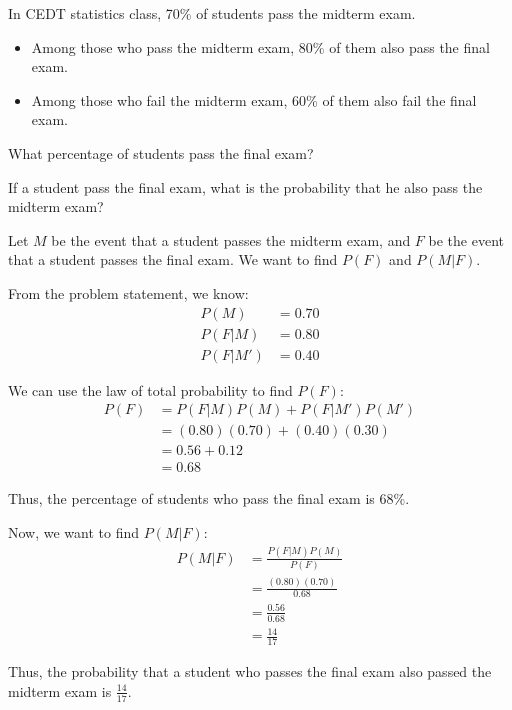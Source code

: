\documentclass[a4paper, 10pt]{article}
\begin{document}
\begin{problem}
In CEDT statistics class, 70\% of students pass the midterm exam.
\begin{itemize}[wide=0pt, itemsep=2pt, parsep=0pt, leftmargin=*]
	\item Among those who pass the midterm exam, 80\% of them also pass the final exam.
	\item Among those who fail the midterm exam, 60\% of them also fail the final exam.
\end{itemize}
\begin{subproblems_alpha}
	\item What percentage of students pass the final exam?
	\item If a student pass the final exam, what is the probability that he also pass the midterm exam?
\end{subproblems_alpha}
\end{problem}

\begin{solution}
	Let \( M \) be the event that a student passes the midterm exam, and \( F \) be the event that a student passes the final exam.
	We want to find \( P(F) \) and \( P(M | F) \).

	\par From the problem statement, we know:
	\begin{align*}
		P(M)      & = 0.70 \\
		P(F | M)  & = 0.80 \\
		P(F | M') & = 0.40
	\end{align*}

	\par We can use the law of total probability to find \( P(F) \):
	\begin{align*}
		P(F) & = P(F | M) P(M) + P(F | M') P(M') \\
		     & = (0.80)(0.70) + (0.40)(0.30)     \\
		     & = 0.56 + 0.12                     \\
		     & = 0.68
	\end{align*}

	Thus, the percentage of students who pass the final exam is \( \boxed{68\%} \).

	\par Now, we want to find \( P(M | F) \):
	\begin{align*}
		P(M | F) & = \frac{P(F | M) P(M)}{P(F)} \\
		         & = \frac{(0.80)(0.70)}{0.68}  \\
		         & = \frac{0.56}{0.68}          \\
		         & = \frac{14}{17}
	\end{align*}

	Thus, the probability that a student who passes the final exam also passed the midterm exam is \( \boxed{\frac{14}{17}} \).
\end{solution}
\end{document}
